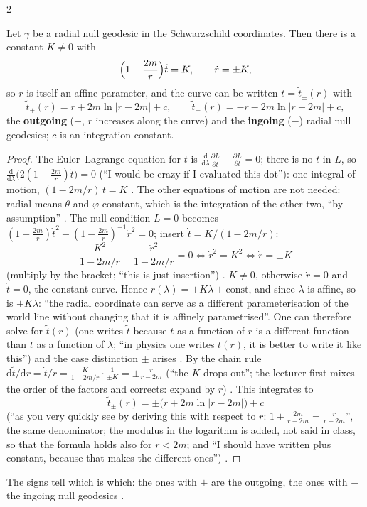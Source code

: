 \begin{paracol}{2}
\begin{proposition}\label{prop:c22-null}
Let $\gamma$ be a radial null geodesic in the Schwarzschild coordinates. Then there is a constant $K\neq0$ with
\[
  \Bigl(1-\frac{2m}{r}\Bigr)\dot t=K,\qquad\dot r=\pm K,
\]
so $r$ is itself an affine parameter, and the curve can be written $t=\tilde t_\pm(r)$ with
\[
  \tilde t_+(r)=r+2m\ln|r-2m|+c,\qquad\tilde t_-(r)=-r-2m\ln|r-2m|+c ,
\]
the \textbf{outgoing} ($+$, $r$ increases along the curve) and the \textbf{ingoing} ($-$) radial null geodesics; $c$ is an integration constant.
\end{proposition}
\begin{proof}
The Euler--Lagrange equation for $t$ is $\frac{\mathrm d}{\mathrm d\lambda}\frac{\partial L}{\partial\dot t}-\frac{\partial L}{\partial t}=0$; there is no $t$ in $L$, so $\frac{\mathrm d}{\mathrm d\lambda}\bigl(2(1-\frac{2m}r)\dot t\bigr)=0$ (``I would be crazy if I evaluated this dot''): one integral of motion, $(1-2m/r)\,\dot t=K$ . The other equations of motion are not needed: radial means $\theta$ and $\varphi$ constant, which is the integration of the other two, ``by assumption'' . The null condition $L=0$ becomes $(1-\frac{2m}r)\dot t^2-(1-\frac{2m}r)^{-1}\dot r^2=0$; insert $\dot t=K/(1-2m/r)$:
\[
  \frac{K^2}{1-2m/r}-\frac{\dot r^2}{1-2m/r}=0\iff\dot r^2=K^2\iff\dot r=\pm K
\]
(multiply by the bracket; ``this is just insertion'') . $K\neq0$, otherwise $\dot r=0$ and $\dot t=0$, the constant curve. Hence $r(\lambda)=\pm K\lambda+\text{const}$, and since $\lambda$ is affine, so is $\pm K\lambda$: ``the radial coordinate can serve as a different parameterisation of the world line without changing that it is affinely parametrised''. One can therefore solve for $\tilde t(r)$ (one writes $\tilde t$ because $t$ as a function of $r$ is a different function than $t$ as a function of $\lambda$; ``in physics one writes $t(r)$, it is better to write it like this'') and the case distinction $\pm$ arises .
By the chain rule $\mathrm d\tilde t/\mathrm dr=\dot t/\dot r=\frac{K}{1-2m/r}\cdot\frac1{\pm K}=\pm\frac{r}{r-2m}$ (``the $K$ drops out''; the lecturer first mixes the order of the factors and corrects: expand by $r$) . This integrates to
\[
  \tilde t_\pm(r)=\pm\bigl(r+2m\ln|r-2m|\bigr)+c
\]
(``as you very quickly see by deriving this with respect to $r$: $1+\frac{2m}{r-2m}=\frac{r}{r-2m}$'', the same denominator; the modulus in the logarithm is added, not said in class, so that the formula holds also for $r<2m$; and ``I should have written plus constant, because that makes the different ones'') .
\end{proof}
The signs tell which is which: the ones with $+$ are the outgoing, the ones with $-$ the ingoing null geodesics .


\end{paracol}
